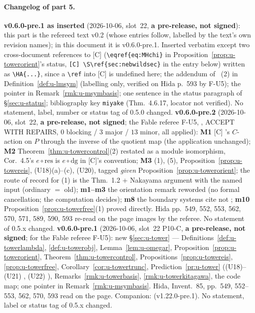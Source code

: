\documentclass[11pt]{article}
\begin{document}
\paragraph{Changelog of part 5.} \textbf{v0.6.0-pre.1 as inserted} (2026-10-06, slot~22, \textbf{a pre-release, not signed}): this part is the refereed text v0.2 (whose entries follow, labelled by the text's own revision
names); in this document it is v0.6.0-pre.1. Inserted verbatim except two cross-document references to [C] (\verb|\eqref{eq:MHchi}| in Proposition~\ref{prop:u-towerorient}'s status, \verb|[C] \S\ref{sec:nebwildsec}| in the
entry below) written as \verb|\HA{...}|, since a \verb|\ref| into [C] is undefined here; the addendum of ~(2) in Definition~\ref{def:u-lmsym} (labelling only, verified on Hida p.~593 by F-U5);
the pointer in Remark~\ref{rmk:u-msymbasis}; one sentence in the status paragraph of \S\ref{sec:u-status}; bibliography key \texttt{miyake} (Thm.~4.6.17, locator not verified). No statement, label, number or status tag of 0.5.0 changed. \textbf{v0.6.0-pre.2} (2026-10-06, slot~22, \textbf{a pre-release, not signed}; the Fable referee F-U5, , ACCEPT WITH REPAIRS, $0$ blocking / $3$ major / $13$ minor, all applied): \textbf{M1} [C] 's $C$-action on $P$ through the inverse of the quotient map (the application unchanged); \textbf{M2} Theorem~\ref{thm:u-towercontrol}(2) restated as a module isomorphism, Cor.~4.5's $e\circ\mathrm{res}$ is $e\circ\mathrm{dg}$ in [C]'s convention; \textbf{M3} (1), (5), Proposition~\ref{prop:u-towereis}, (U18)(a)--(c), (U20),  tagged \PROVED{} \emph{given} Proposition~\ref{prop:u-towerorient}; the route of record for (1) is the Thm.~1.2 + Nakayama argument with the named \STD{} input (ordinary $=$ old); \textbf{m1--m3} the orientation remark reworded (no formal cancellation; the computation decides); \textbf{m8} the boundary systems cite \STD{} not ; \textbf{m10} Proposition~\ref{prop:u-towerfree}(1) proved directly. Hida pp.~549, 552, 553, 562, 570, 571, 589, 590, 593 re-read on the page images by the referee. No statement of 0.5.x changed. \textbf{v0.6.0-pre.1} (2026-10-06, slot~22 P10-C, \textbf{a pre-release, not signed}; for the Fable referee F-U5): new \S\ref{sec:u-tower} ---
Definitions~\ref{def:u-towerlambda}, \ref{def:u-towerobj}, Lemma~\ref{lem:u-omegar}, Proposition~\ref{prop:u-towerorient}, Theorem~\ref{thm:u-towercontrol}, Propositions~\ref{prop:u-towereis}, \ref{prop:u-towerfree},
Corollary~\ref{cor:u-towertrunc}, Prediction~\ref{pr:u-tower} ((U18)--(U21) \PROVED, (U22) \CONJ), Remarks~\ref{rmk:u-towerbasis}, \ref{rmk:u-towerkitagawa}, the code map; one pointer in
Remark~\ref{rmk:u-msymbasis}. Hida, Invent.\ 85, pp.~549, 552--553, 562, 570, 593 read on the page. Companion:  (v1.22.0-pre.1). No statement, label or status tag of 0.5.x
changed.
\end{document}
